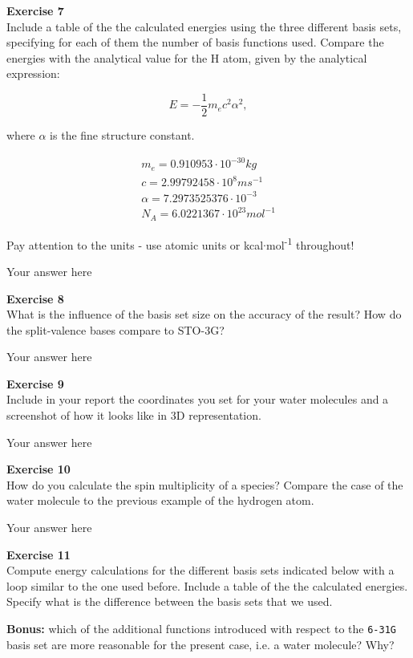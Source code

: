 \documentclass{article}
\begin{document}
\begin{mdframed}
\textbf{Exercise 7}\\
Include a table of the the calculated energies using the three different basis sets, specifying for each of them the number of basis functions used. Compare the energies with the analytical value for the H atom, given by the analytical expression:

\begin{equation}
E = -\frac{1}{2} m_e c^2\alpha^2,
\end{equation}

where $\alpha$ is the fine structure constant.

\begin{align}
m_e = 0.910953\cdot10^{-30} kg\\
c = 2.99792458\cdot10^8 m s^{-1}\\
\alpha = 7.2973525376\cdot10^{-3}\\
N_A = 6.0221367\cdot10^{23}mol^{-1}
\end{align}

Pay attention to the units - use atomic units or kcal$\cdot$mol\textsuperscript{-1} throughout!
\end{mdframed}

Your answer here

\begin{mdframed}
\textbf{Exercise 8}\\
What is the influence of the basis set size on the accuracy of the result? How do the split-valence bases compare to STO-3G?
\end{mdframed}

Your answer here

\begin{mdframed}
\textbf{Exercise 9}\\
Include in your report the coordinates you set for your water molecules and a screenshot of how it looks like in 3D representation.
\end{mdframed}

Your answer here

\begin{mdframed}
\textbf{Exercise 10}\\
How do you calculate the spin multiplicity of a species? Compare the case of the water molecule to the previous example of the hydrogen atom.
\end{mdframed}

Your answer here

\begin{mdframed}
\textbf{Exercise 11}\\
Compute energy calculations for the different basis sets indicated below with a loop similar to the one used before.  Include a table of the the calculated energies. Specify what is the difference between the basis sets that we used.

\textbf{Bonus:} which of the additional functions introduced with respect to the \texttt{6-31G} basis set are more reasonable for the present case, i.e. a water molecule? Why?
\end{mdframed}
\end{document}
